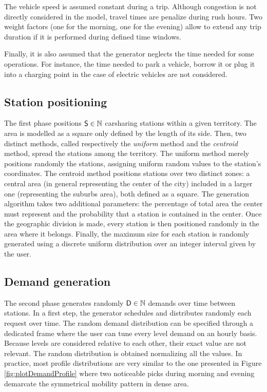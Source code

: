\begin{bibunit}[ieeetr]
\medskip
The vehicle speed is assumed constant during a trip.
Although congestion is not directly considered in the model, travel times are penalize during rush hours.
Two weight factors (one for the morning, one for the evening) allow to extend any trip duration if it is performed during defined time windows.

\medskip
Finally, it is also assumed that the generator neglects the time needed for some operations.
For instance, the time needed to park a vehicle, borrow it or plug it into a charging point in the case of electric vehicles are not considered.


\subsection{Station positioning}
The first phase positions $\mathsf{S} \in \mathbb{N}$ carsharing stations within a given territory.
The area is modelled as a square only defined by the length of its side.
Then, two distinct methods, called respectively the \emph{uniform} method and the \emph{centroid} method, spread the stations among the territory.
The uniform method merely positions randomly the stations, assigning uniform random values to the station's coordinates.
The centroid method positions stations over two distinct zones: a central area (in general representing the center of the city) included in a larger one (representing the suburbs area), both defined as a square.
The generation algorithm takes two additional parameters: the percentage of total area the center must represent and the probability that a station is contained in the center.
Once the geographic division is made, every station is then positioned randomly in the area where it belongs. 
Finally, the maximum size for each station is randomly generated using a discrete uniform distribution over an integer interval given by the user. %


\subsection{Demand generation}
The second phase generates randomly $\mathsf{D} \in \mathbb{N}$ demands over time between stations.
In a first step, the generator schedules and distributes randomly each request over time.
The random demand distribution can be specified through a dedicated frame where the user can tune every level demand on an hourly basis.
Because levels are considered relative to each other, their exact value are not relevant.
The random distribution is obtained normalizing all the values. %
In practice, most profile distributions are very similar to the one presented in Figure \ref{fig:plotDemandProfile} where two noticeable picks during morning and evening demarcate the symmetrical mobility pattern in dense area.


\end{bibunit}
